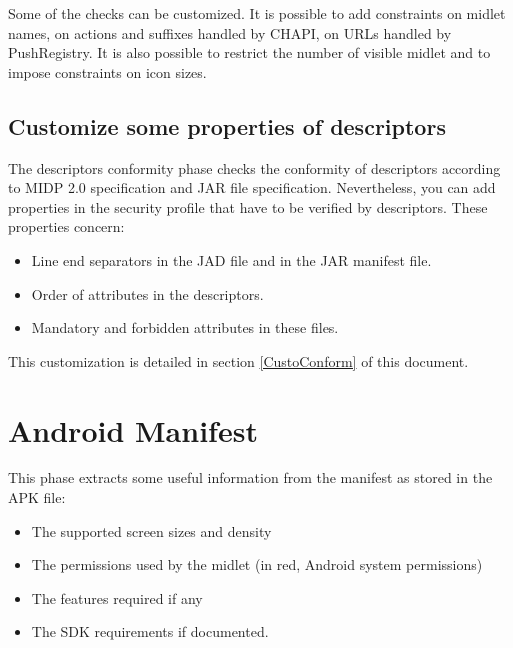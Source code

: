 Some of the checks can be customized. It is possible to add constraints on
midlet names, on actions and suffixes handled by CHAPI,  on URLs handled
by PushRegistry.
It is also possible to restrict the number of visible midlet and to impose
constraints on icon sizes.


\subsection*{Customize some properties of descriptors}
The descriptors conformity phase checks the conformity of descriptors
according to MIDP 2.0 specification and JAR file specification. Nevertheless,
you can add properties in the security profile that have to be 
verified by descriptors. These properties concern:
\begin{itemize}
  \item Line end separators in the JAD file and in the JAR manifest file.
  \item Order of attributes in the descriptors.
  \item Mandatory and forbidden attributes in these files.
\end{itemize}
This customization is detailed in section \ref{CustoConform} of this document.

\section{Android Manifest}
This phase extracts some useful information from the manifest as stored in the
APK file:
\begin{itemize}
  \item The supported screen sizes and density
  \item The permissions used by the midlet (in red, Android system permissions)
  \item The features required if any 
  \item The SDK requirements if documented.
\end{itemize}
